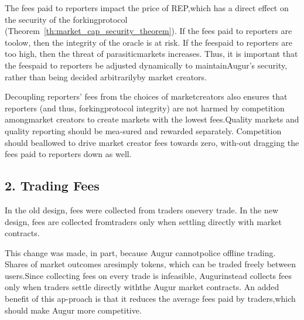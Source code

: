 \documentclass[12pt,floatfix,reprint,nofootinbib,amsmath,amssymb,epsfig,pre,floats,letterpaper,groupedaffiliation]{revtex4-1}
\theoremstyle{definition}
\theoremstyle{definition}
\begin{document}
The fees paid to reporters impact the price of REP,\linebreak which has a direct effect on the security of the forking\linebreak protocol (Theorem~\ref{th:market_cap_security_theorem}). If the fees paid to reporters are too\linebreak low, then the integrity of the oracle is at risk. If the fees\linebreak paid to reporters are too high, then the threat of parasitic\linebreak markets increases. Thus, it is important that the fees\linebreak paid to reporters be adjusted dynamically to maintain\linebreak Augur's security, rather than being decided arbitrarily\linebreak by market creators.

Decoupling reporters' fees from the choices of market\linebreak creators also ensures that reporters (and thus, forking\linebreak protocol integrity) are not harmed by competition among\linebreak market creators to create markets with the lowest fees.\linebreak Quality markets and quality reporting should be mea-\linebreak sured and rewarded separately. Competition should be\linebreak allowed to drive market creator fees towards zero, with-\linebreak out dragging the fees paid to reporters down as well.

\subsection*{2. Trading Fees}

In the old design, fees were collected from traders on\linebreak every trade. In the new design, fees are collected from\linebreak traders only when settling directly with market contracts.

This change was made, in part, because Augur cannot\linebreak police offline trading. Shares of market outcomes are\linebreak simply tokens, which can be traded freely between users.\linebreak Since collecting fees on every trade is infeasible, Augur\linebreak instead collects fees only when traders settle directly with\linebreak the Augur market contracts. An added benefit of this ap-\linebreak proach is that it reduces the average fees paid by traders,\linebreak which should make Augur more competitive. \vspace*{-0.5\baselineskip}
\end{document}
